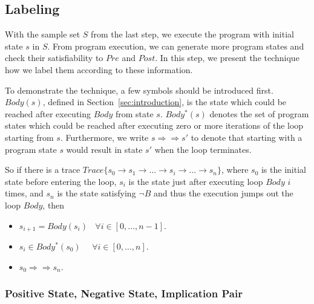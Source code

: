 

\subsection {Labeling}
With the sample set $S$ from the last step, we execute the program with initial state $s$ in $S$.
From program execution, we can generate more program states and check their satisfiability to $Pre$ and $Post$.
In this step, we present the technique how we label them according to these information.

To demonstrate the technique, a few symbols should be introduced first.
$Body(s)$, defined in Section~\ref{sec:introduction}, is the state which could be reached after executing $Body$ from state $s$.
$Body^*(s)$ denotes the set of program states which could be reached after executing zero or more iterations of the loop starting from $s$.
Furthermore, we write $s \Rightarrow\Rightarrow s'$ to denote that starting with a program state $s$ would result in state $s'$ when the loop terminates. 

So if there is a trace $Trace\{s_0 \to s_1 \to ...\to s_i \to ... \to s_n\}$, 
where $s_0$ is the initial state before entering the loop, 
$s_i$ is the state just after executing loop $Body$ $i$ times,
and $s_n$ is the state satisfying $\neg B$ and thus the execution jumps out the loop $Body$,
then 
\begin{itemize}
\item $s_{i+1} = Body(s_i)~~~~\forall i \in [0, \ldots, n-1]$.
\item $s_{i} \in Body^*(s_0)~~~~~~\forall i \in [0, \ldots, n]$.
\item $s_{0} \Rightarrow\Rightarrow s_{n}$.
\end{itemize}



\subsubsection*{Positive State, Negative State, Implication Pair}


